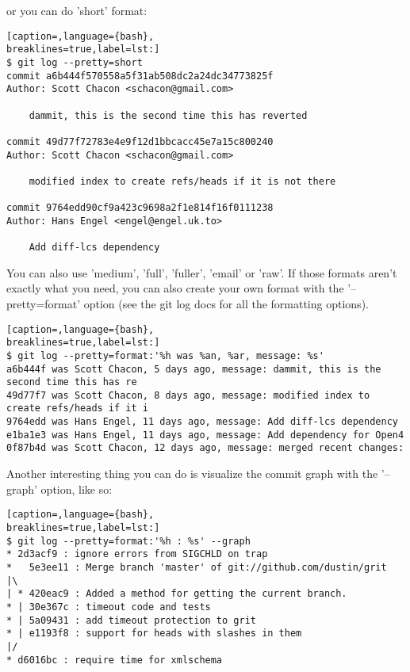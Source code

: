 or you can do 'short' format:
\lstset{basicstyle=\scriptsize, numbers=none, captionpos=b, tabsize=4}
\begin{lstlisting}[caption=,language={bash},
breaklines=true,label=lst:]
$ git log --pretty=short
commit a6b444f570558a5f31ab508dc2a24dc34773825f
Author: Scott Chacon <schacon@gmail.com>

    dammit, this is the second time this has reverted

commit 49d77f72783e4e9f12d1bbcacc45e7a15c800240
Author: Scott Chacon <schacon@gmail.com>

    modified index to create refs/heads if it is not there

commit 9764edd90cf9a423c9698a2f1e814f16f0111238
Author: Hans Engel <engel@engel.uk.to>

    Add diff-lcs dependency
\end{lstlisting}

You can also use 'medium', 'full', 'fuller', 'email' or 'raw'. If those formats
aren't exactly what you need, you can also create your own format with the
'--pretty=format' option (see the git log docs for all the formatting options).
\lstset{basicstyle=\scriptsize, numbers=none, captionpos=b, tabsize=4}
\begin{lstlisting}[caption=,language={bash},
breaklines=true,label=lst:]
$ git log --pretty=format:'%h was %an, %ar, message: %s'
a6b444f was Scott Chacon, 5 days ago, message: dammit, this is the second time this has re
49d77f7 was Scott Chacon, 8 days ago, message: modified index to create refs/heads if it i
9764edd was Hans Engel, 11 days ago, message: Add diff-lcs dependency
e1ba1e3 was Hans Engel, 11 days ago, message: Add dependency for Open4
0f87b4d was Scott Chacon, 12 days ago, message: merged recent changes:
\end{lstlisting}

Another interesting thing you can do is visualize the commit graph with the '--graph' option, like so:
\lstset{basicstyle=\scriptsize, numbers=none, captionpos=b, tabsize=4}
\begin{lstlisting}[caption=,language={bash},
breaklines=true,label=lst:]
$ git log --pretty=format:'%h : %s' --graph
* 2d3acf9 : ignore errors from SIGCHLD on trap
*   5e3ee11 : Merge branch 'master' of git://github.com/dustin/grit
|\  
| * 420eac9 : Added a method for getting the current branch.
* | 30e367c : timeout code and tests
* | 5a09431 : add timeout protection to grit
* | e1193f8 : support for heads with slashes in them
|/  
* d6016bc : require time for xmlschema
\end{lstlisting}

